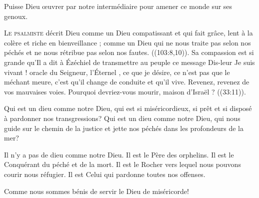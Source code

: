 Puisse Dieu \oe{}uvrer par notre intermédiaire pour amener ce monde sur ses genoux.

\dvrule






\lettrine{L}{e psalmiste} décrit Dieu comme un Dieu \Og compatissant
 et qui fait grâce, lent à la colère et riche en bienveillance \Fg{} ;
 comme un Dieu \Og qui ne nous traite pas selon nos péchés et ne nous rétribue pas
 selon nos fautes. \Fg{} ((103:8,10)).
 Sa compassion est si grande qu'Il a dit à Ézéchiel de transmettre au peuple
 ce message\frcolon{} Dis-leur\frcolon{}  \Og Je suis vivant !
 \ocadr oracle du Seigneur, l'Éternel \fcadr{}, ce que je désire,
 ce n'est pas que le méchant meure, c'est qu'il change de conduite
 et qu'il vive. Revenez, revenez de vos mauvaises voies.
 Pourquoi devriez-vous mourir, maison d'Israël ? \Fg{} ((33:11)). 


Qui est un dieu comme notre Dieu, qui est si miséricordieux,
 si prêt et si disposé à pardonner nos transgressions?
 Qui est un dieu comme notre Dieu, qui nous guide sur le chemin
 de la justice et jette nos péchés dans les profondeurs de la mer? 

Il n'y a pas de dieu comme notre Dieu. Il est le Père des orphelins.
 Il est le Conquérant du péché et de la mort. Il est le Rocher
 vers lequel nous pouvons courir nous réfugier.
 Il est Celui qui pardonne toutes nos offenses. 

Comme nous sommes bénis de servir le Dieu de miséricorde! 

\dvrule



